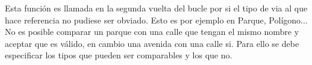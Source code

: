 \begin{itemize}
    
    
    
    
    
    
Esta función es llamada en la segunda vuelta del bucle por si el tipo de via al que hace referencia no pudiese ser obviado. Esto es por ejemplo en Parque, Polígono... No es posible comparar un parque con una calle que tengan el mismo nombre y aceptar que es válido, en cambio una avenida con una calle si. Para ello se debe especificar los tipos que pueden ser comparables y los que no.






\end{itemize}





